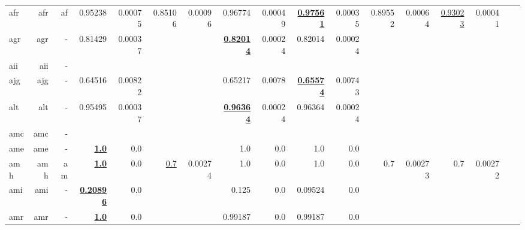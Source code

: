 \documentclass[11pt]{article}
\begin{document}
\begin{table*}[h]
{\begin{tabular}{lrrrrrrrrrrrrrrrr}
afr         & afr         & af         & 0.95238         & 0.00075         & 0.85106         & 0.00096         & 0.96774         & 0.00049         & \textbf{\underline{0.97561}}         & 0.00035         & 0.89552         & 0.00064         & \underline{0.93023}         & 0.00041         \\
agr         & agr         & -         & 0.81429         & 0.00037         &          &          & \textbf{\underline{0.82014}}         & 0.00024         & 0.82014         & 0.00024         &          &          &          &          \\
aii         & aii         & -         &          &          &          &          &          &          &          &          &          &          &          &          \\
ajg         & ajg         & -         & 0.64516         & 0.00822         &          &          & 0.65217         & 0.0078         & \textbf{\underline{0.65574}}         & 0.00743         &          &          &          &          \\
alt         & alt         & -         & 0.95495         & 0.00037         &          &          & \textbf{\underline{0.96364}}         & 0.00024         & 0.96364         & 0.00024         &          &          &          &          \\
amc         & amc         & -         &          &          &          &          &          &          &          &          &          &          &          &          \\
ame         & ame         & -         & \textbf{\underline{1.0}}         & 0.0         &          &          & 1.0         & 0.0         & 1.0         & 0.0         &          &          &          &          \\
amh         & amh         & am         & \textbf{\underline{1.0}}         & 0.0         & \underline{0.7}         & 0.00274         & 1.0         & 0.0         & 1.0         & 0.0         & 0.7         & 0.00273         & 0.7         & 0.00272         \\
ami         & ami         & -         & \textbf{\underline{0.20896}}         & 0.0         &          &          & 0.125         & 0.0         & 0.09524         & 0.0         &          &          &          &          \\
amr         & amr         & -         & \textbf{\underline{1.0}}         & 0.0         &          &          & 0.99187         & 0.0         & 0.99187         & 0.0         &          &          &          &          \\

\end{tabular}}
\end{table*}
\end{document}
